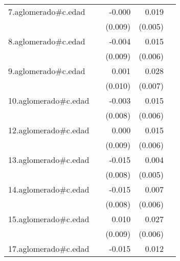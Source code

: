 {\begin{longtable}{l*{4}{D{.}{.}{-1}}}
\addlinespace
7.aglomerado#c.edad&                     &      -0.000         &       0.019\sym{***}&                     \\
            &                     &     (0.009)         &     (0.005)         &                     \\
\addlinespace
8.aglomerado#c.edad&                     &      -0.004         &       0.015\sym{*}  &                     \\
            &                     &     (0.009)         &     (0.006)         &                     \\
\addlinespace
9.aglomerado#c.edad&                     &       0.001         &       0.028\sym{***}&                     \\
            &                     &     (0.010)         &     (0.007)         &                     \\
\addlinespace
10.aglomerado#c.edad&                     &      -0.003         &       0.015\sym{**} &                     \\
            &                     &     (0.008)         &     (0.006)         &                     \\
\addlinespace
12.aglomerado#c.edad&                     &       0.000         &       0.015\sym{*}  &                     \\
            &                     &     (0.009)         &     (0.006)         &                     \\
\addlinespace
13.aglomerado#c.edad&                     &      -0.015         &       0.004         &                     \\
            &                     &     (0.008)         &     (0.005)         &                     \\
\addlinespace
14.aglomerado#c.edad&                     &      -0.015         &       0.007         &                     \\
            &                     &     (0.008)         &     (0.006)         &                     \\
\addlinespace
15.aglomerado#c.edad&                     &       0.010         &       0.027\sym{***}&                     \\
            &                     &     (0.009)         &     (0.006)         &                     \\
\addlinespace
17.aglomerado#c.edad&                     &      -0.015         &       0.012         &                     \\

\end{longtable}}
